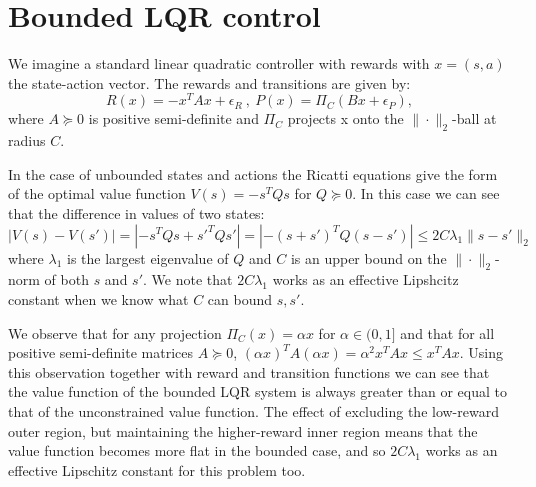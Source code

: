 \documentclass{article}
\begin{document}

\section{Bounded LQR control}
\label{app: Bounded LQR}

We imagine a standard linear quadratic controller with rewards with $x = (s,a)$ the state-action vector.
The rewards and transitions are given by:
$$ R(x) = -x^T A x + \epsilon_R \ , \ P(x) = \Pi_C (Bx + \epsilon_P),$$
where $A \succcurlyeq 0$ is positive semi-definite and $\Pi_C$ projects x onto the $\| \cdot \|_2$-ball at radius $C$.

In the case of unbounded states and actions the Ricatti equations give the form of the optimal value function $V(s) = -s^T Q s$ for $Q \succcurlyeq 0$.
In this case we can see that the difference in values of two states:
$$ |V(s) - V(s')| = |-s^T Q s + {s'}^T Q s' | = |-(s + s')^T Q (s-s')| \le 2C\lambda_1 \|s-s'\|_2 $$
where $\lambda_1$ is the largest eigenvalue of $Q$ and $C$ is an upper bound on the $\| \cdot \|_2$-norm of both $s$ and $s'$.
We note that $2C \lambda_1$ works as an effective Lipshcitz constant when we know what $C$ can bound $s, s'$.

We observe that for any projection $\Pi_C(x) = \alpha x$ for $\alpha \in (0, 1]$ and that for all positive semi-definite matrices $A \succcurlyeq 0$, $(\alpha x)^T A (\alpha x) = \alpha^2 x^T A x \le x^T A x$.
Using this observation together with reward and transition functions we can see that the value function of the bounded LQR system is always greater than or equal to that of the unconstrained value function.
The effect of excluding the low-reward outer region, but maintaining the higher-reward inner region means that the value function becomes more flat in the bounded case, and so $2C \lambda_1$ works as an effective Lipschitz constant for this problem too.

\end{document}
